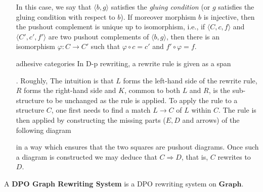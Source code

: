 \begin{itemize}
\begin{proposition}
                In this case, we say that $\langle b, g \rangle$ satisfies the \textit{gluing condition} (or $g$ satisfies the gluing condition with respect to $b$). If moreover morphism $b$ is injective, then the pushout complement is unique up to isomorphism, i.e., if $\langle C, c, f \rangle$ and $\langle C', c', f' \rangle$ are two pushout complements of $\langle b, g \rangle$, then there is an isomorphism $\varphi : C \mathop{\to} C'$ such that $\varphi \circ c \mathop{=} c'$ and $f' \circ \varphi \mathop{=} f$.
                \end{proposition}
            
        \item[adhesive categories] In D-p rewriting, a rewrite rule is given as a span 
        . 
        Roughly, The intuition is that \( L \) forms the left-hand side of the rewrite rule, \( R \) forms the right-hand side and \( K \), common to both \( L \) and \( R \), is the sub-structure to be unchanged as the rule is applied. To apply the rule to a structure \( C \), one first needs to find a match \( L \mathop{\to} C \) of \( L \) within \( C \). The rule is then applied by constructing the missing parts (\( E, D \) and arrows) of the following diagram
        \begin{figure}[H]
        \end{figure}
        in a way which ensures that the two squares are pushout diagrams. Once such a diagram is constructed we may deduce that \( C \mathop{\Rightarrow} D \), that is, \( C \) rewrites to \( D \).
        
    \end{itemize}
    
    
    
    \begin{definition}
        A \textbf{DPO Graph Rewriting System} is a DPO rewriting system on $\mathbf{Graph}$.  
    \end{definition}
    
